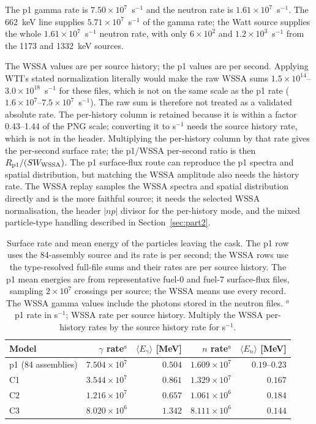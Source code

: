 \documentclass[11pt,a4paper]{article}
\begin{document}
The p1 gamma rate is $7.50\times10^{7}$~s$^{-1}$ and the neutron rate is
$1.61\times10^{7}$~s$^{-1}$.  The 662~keV line supplies
$5.71\times10^{7}$~s$^{-1}$ of the gamma rate; the Watt source supplies the
whole $1.61\times10^{7}$~s$^{-1}$ neutron rate, with only $6\times10^{2}$ and
$1.2\times10^{3}$~s$^{-1}$ from the 1173 and 1332~keV sources.

The WSSA values are per source history; the p1 values are per second.  Applying
WTI's stated normalization literally would make the raw WSSA sums
$1.5\times10^{14}$--$3.0\times10^{18}$~s$^{-1}$ for these files, which is not on
the same scale as the p1 rate ($1.6\times10^{7}$--$7.5\times10^{7}$~s$^{-1}$).
The raw sum is therefore not treated as a validated absolute rate.  The
per-history column is retained because it is within a factor 0.43--1.44 of the
PNG scale; converting it to s$^{-1}$ needs the source history rate, which is not
in the header.  Multiplying the per-history column by that rate gives the
per-second surface rate; the p1/WSSA per-second ratio is then
$R_{\rm p1}/(S W_{\rm WSSA})$.  The p1 surface-flux route can reproduce the p1
spectra and spatial distribution, but matching the WSSA amplitude also needs the
history rate.  The WSSA replay
samples the WSSA spectra and spatial distribution directly and is the more
faithful source; it needs the selected WSSA normalisation, the header $|np|$
divisor for the per-history mode, and the mixed particle-type handling
described in Section~\ref{sec:part2}.

\begin{table}[t]
\centering
\caption{Surface rate and mean energy of the particles leaving the cask.  The
p1 row uses the 84-assembly source and its rate is per second; the WSSA rows
use the type-resolved full-file sums and their rates are per source history.
The p1 mean energies are from representative fuel-0 and fuel-7 surface-flux
files, sampling $2\times10^{7}$ crossings per source; the WSSA means use every
record.  The WSSA gamma values include the photons stored in the neutron
files.  $^{a}$p1 rate in s$^{-1}$; WSSA rate per source history.  Multiply
the WSSA per-history rates by the source history rate for s$^{-1}$.}
\label{tab:mean_energy}
\footnotesize
\begin{tabular}{@{}l r r r r@{}}
\toprule
Model & $\gamma$ rate$^{a}$ & $\langle E_\gamma\rangle$ [MeV]
      & $n$ rate$^{a}$ & $\langle E_n\rangle$ [MeV] \\
\midrule
p1 (84 assemblies) & $7.504\times10^{7}$ & $0.504$ & $1.609\times10^{7}$ & $0.19$--$0.23$ \\
C1 & $3.544\times10^{7}$ & $0.861$ & $1.329\times10^{7}$ & $0.167$ \\
C2 & $1.216\times10^{7}$ & $0.657$ & $1.061\times10^{6}$ & $0.184$ \\
C3 & $8.020\times10^{6}$ & $1.342$ & $8.111\times10^{6}$ & $0.144$ \\
\bottomrule
\end{tabular}
\end{table}
\end{document}
